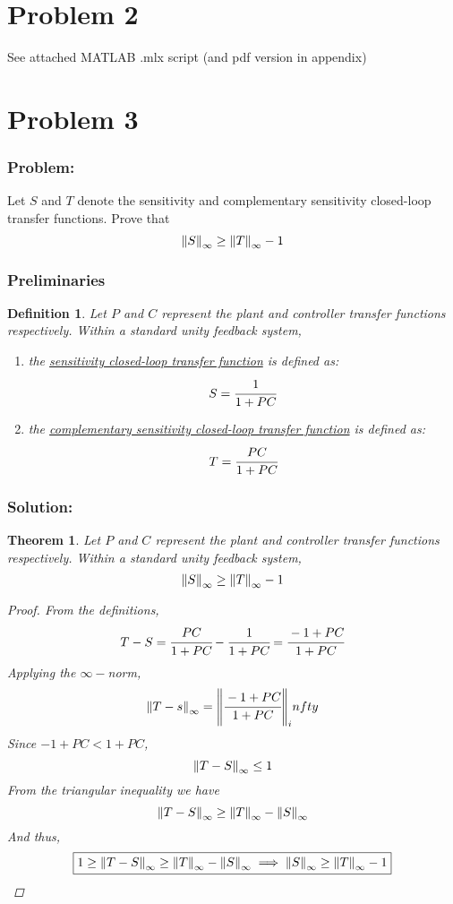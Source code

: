 \documentclass[letter]{article}
\numberwithin{equation}{section}
\newtheorem{definition}{Definition}
\newtheorem{theorem}{Theorem}
\begin{document}
\section{Problem 2}
See attached MATLAB .mlx script (and pdf version in appendix)

\newpage
\section{Problem 3}
\subsubsection*{Problem:}
Let $S$ and $T$ denote the sensitivity and complementary sensitivity closed-loop transfer functions.
Prove that\[
    \norm{S}_\infty \geq \norm{T}_\infty - 1
\]
\subsubsection*{Preliminaries}
\begin{definition}
    Let $P$ and $C$ represent the plant and controller transfer functions respectively. 
    Within a standard unity feedback system, \begin{enumerate}
        \item the \underline{\emph{sensitivity closed-loop transfer function}} is defined as:\[
            S = \cfrac{1}{1+PC}
        \] \item the \underline{\emph{complementary sensitivity closed-loop transfer function}} is defined as:\[
            T = \cfrac{PC}{1+PC}
        \]
    \end{enumerate}
\end{definition}
\subsubsection*{Solution:}
\begin{theorem}
    Let $P$ and $C$ represent the plant and controller transfer functions respectively. 
    Within a standard unity feedback system, \[
        \norm{S}_\infty \geq \norm{T}_\infty - 1
    \]
    \begin{proof}
        From the definitions, \[
            T - S = \cfrac{PC}{1+PC} - \cfrac{1}{1+PC} = \cfrac{-1 + PC}{1 + PC}
        \] Applying the $\infty-$norm,\[
            \norm{T - s}_\infty = \norm{\cfrac{-1 + PC}{1 + PC}}_infty
        \] Since ${-1 + PC} < {1 + PC}$, \[
            \norm{T - S}_\infty \leq 1
        \] From the triangular inequality we have\[
            \norm{T - S}_\infty \geq \norm{T}_\infty - \norm{S}_\infty
        \] And thus,\[\boxed{
            1 \geq \norm{T - S}_\infty \geq \norm{T}_\infty - \norm{S}_\infty
            \implies \norm{S}_\infty \geq \norm{T}_\infty - 1
        }\]
    \end{proof}
\end{theorem}
\end{document}
